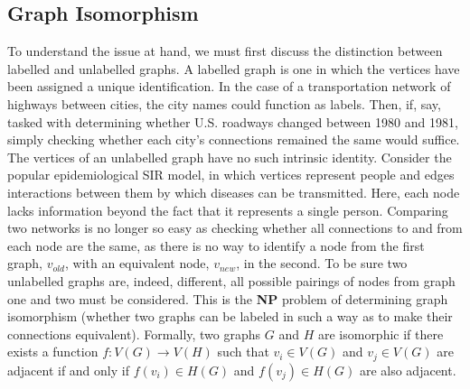 \documentclass[11pt]{article}
\begin{document}
\subsection{Graph Isomorphism}
To understand the issue at hand, we must first discuss the distinction between labelled and unlabelled graphs. A labelled graph is one in which the vertices have been assigned a unique identification. In the case of a transportation network of highways between cities, the city names could function as labels. Then, if, say, tasked with determining whether U.S. roadways changed between 1980 and 1981, simply checking whether each city's connections remained the same would suffice. The vertices of an unlabelled graph have no such intrinsic identity. Consider the popular epidemiological SIR model, in which vertices represent people and edges interactions between them by which diseases can be transmitted. Here, each node lacks information beyond the fact that it represents a single person. Comparing two networks is no longer so easy as checking whether all connections to and from each node are the same, as there is no way to identify a node from the first graph, $v_{old}$, with an equivalent node, $v_{new}$, in the second. To be sure two unlabelled graphs are, indeed, different, all possible pairings of nodes from graph one and two must be considered. This is the \textbf{NP} problem of determining graph isomorphism (whether two graphs can be labeled in such a way as to make their connections equivalent). Formally, two graphs $G$ and $H$ are isomorphic if there exists a function $f:V(G) \rightarrow V(H)$ such that $v_{i} \in V(G)$ and $v_{j} \in V(G)$ are adjacent if and only if $f(v_{i}) \in H(G)$ and $f(v_{j}) \in H(G)$ are also adjacent. \vspace{1mm}
\end{document}
